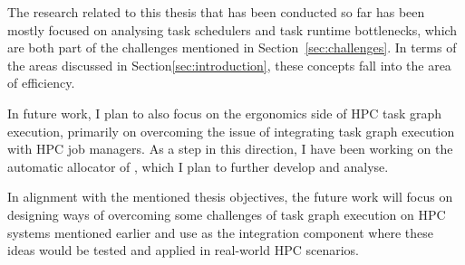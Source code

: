 The research related to this thesis that has been conducted so far has been mostly focused on
analysing task schedulers and task runtime bottlenecks, which are both part of the
challenges mentioned in Section~\ref{sec:challenges}. In terms of the areas discussed in
Section\ref{sec:introduction}, these concepts fall into the area of efficiency.

In future work, I plan to also focus on the ergonomics side of HPC task graph execution,
primarily on overcoming the issue of integrating task graph execution with HPC job managers. As
a step in this direction, I have been working on the automatic allocator of \hyperqueue{}, which
I plan to further develop and analyse.

In alignment with the mentioned thesis objectives, the future work will focus on designing ways
of overcoming some challenges of task graph execution on HPC systems mentioned earlier and
use \hyperqueue{} as the integration component where these ideas would be tested and applied in
real-world HPC scenarios.
